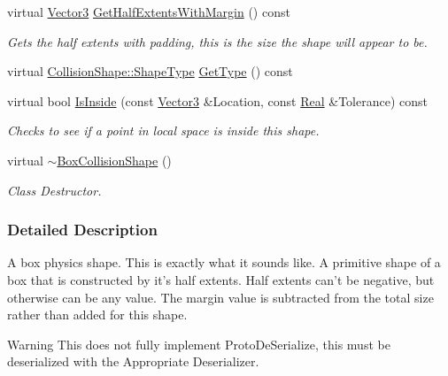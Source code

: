 \begin{DoxyCompactItemize}
virtual \hyperlink{classMezzanine_1_1Vector3}{Vector3} \hyperlink{classMezzanine_1_1BoxCollisionShape_a198887a16d922effe302695ff69bcd88}{GetHalfExtentsWithMargin} () const 
\begin{DoxyCompactList}\small\item\em Gets the half extents with padding, this is the size the shape will appear to be. \item\end{DoxyCompactList}\item 
virtual \hyperlink{classMezzanine_1_1CollisionShape_ad04186055565998879b64176d6dd100d}{CollisionShape::ShapeType} \hyperlink{classMezzanine_1_1BoxCollisionShape_ae2b4af7afa6cc37c51b062589048e26d}{GetType} () const 
\item 
virtual bool \hyperlink{classMezzanine_1_1BoxCollisionShape_a1902aa75d5c18ad4ce090952b6af0050}{IsInside} (const \hyperlink{classMezzanine_1_1Vector3}{Vector3} \&Location, const \hyperlink{namespaceMezzanine_a726731b1a7df72bf3583e4a97282c6f6}{Real} \&Tolerance) const 
\begin{DoxyCompactList}\small\item\em Checks to see if a point in local space is inside this shape. \item\end{DoxyCompactList}\item 
\hypertarget{classMezzanine_1_1BoxCollisionShape_a3698d2ef0c9a0ab92809b2ff2ba62792}{
virtual \hyperlink{classMezzanine_1_1BoxCollisionShape_a3698d2ef0c9a0ab92809b2ff2ba62792}{$\sim$BoxCollisionShape} ()}
\label{classMezzanine_1_1BoxCollisionShape_a3698d2ef0c9a0ab92809b2ff2ba62792}

\begin{DoxyCompactList}\small\item\em Class Destructor. \item\end{DoxyCompactList}\end{DoxyCompactItemize}


\subsubsection{Detailed Description}
A box physics shape. This is exactly what it sounds like. A primitive shape of a box that is constructed by it's half extents. Half extents can't be negative, but otherwise can be any value. The margin value is subtracted from the total size rather than added for this shape. \begin{DoxyWarning}{Warning}
This does not fully implement ProtoDeSerialize, this must be deserialized with the Appropriate Deserializer. 
\end{DoxyWarning}


